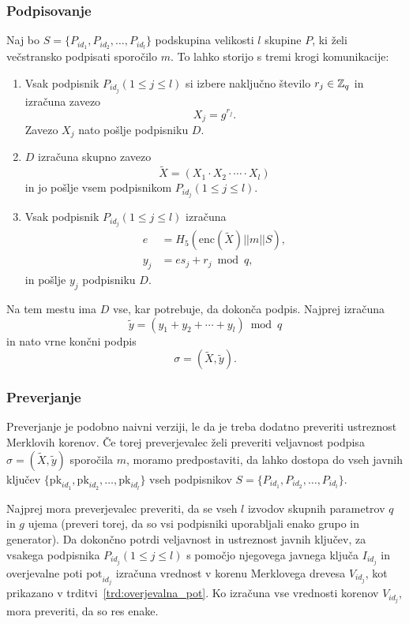 \subsubsection{Podpisovanje}
Naj bo $S = \{P_{id_1}, P_{id_2}, \dots, P_{id_l}\}$ podskupina velikosti $l$ skupine $P$, ki želi
večstransko podpisati sporočilo $m$. To lahko storijo s tremi krogi komunikacije:
\begin{enumerate}
    \item Vsak podpisnik $P_{id_j} (1 \le j \le l)$ si izbere naključno število $r_j \in \mathbb Z_q$
        in izračuna zavezo
        $$
        X_j = g^{r_j}.
        $$
        Zavezo $X_j$ nato pošlje podpisniku $D$.
    \item $D$ izračuna skupno zavezo
        $$
        \tilde{X} = (X_1 \cdot X_2 \cdot \cdots \cdot X_l)
        $$
        in jo pošlje vsem podpisnikom $P_{id_j} (1 \le j \le l)$.
    \item Vsak podpisnik $P_{id_j} (1 \le j \le l)$ izračuna
        \begin{align*}
            e &= H_5(\text{enc}(\tilde{X}) || m || S), \\
            y_j &= e s_j + r_j \bmod q,
        \end{align*}
        in pošlje $y_j$ podpisniku $D$.
\end{enumerate}
Na tem mestu ima $D$ vse, kar potrebuje, da dokonča podpis. Najprej izračuna
$$
\tilde{y} = (y_1 + y_2 + \cdots + y_l) \bmod q
$$
in nato vrne končni podpis
$$
\sigma = (\tilde{X}, \tilde{y}).
$$

\subsubsection{Preverjanje}
Preverjanje je podobno naivni verziji, le da je treba dodatno preveriti ustreznost Merklovih
korenov. Če torej preverjevalec želi preveriti veljavnost podpisa $\sigma = (\tilde{X}, \tilde{y})$
sporočila $m$, moramo predpostaviti, da lahko dostopa do vseh javnih ključev $\{\text{pk}_{id_1},
\text{pk}_{id_2}, \dots, \text{pk}_{id_l}\}$ vseh podpisnikov $S = \{P_{id_1}, P_{id_2}, \dots, 
P_{id_l}\}$.

Najprej mora preverjevalec preveriti, da se vseh $l$ izvodov skupnih parametrov $q$ in $g$ ujema (preveri
torej, da so vsi podpisniki uporabljali enako grupo in generator). Da dokončno potrdi veljavnost in
ustreznost javnih ključev, za vsakega podpisnika $P_{id_j} (1 \le j \le l)$ s pomočjo njegovega javnega
ključa $I_{id_j}$ in overjevalne poti $\text{pot}_{id_j}$ izračuna vrednost v korenu Merklovega drevesa
$V_{id_j}$, kot prikazano v trditvi~\ref{trd:overjevalna_pot}. Ko izračuna vse vrednosti korenov
$V_{id_j}$, mora preveriti, da so res enake.

